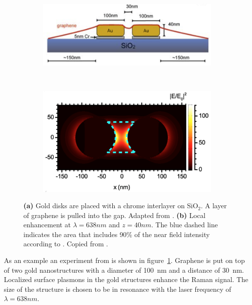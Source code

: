 \begin{figure}[!h]
  \centering
  \begin{subfigure}{0.45\textwidth}
    \includegraphics[width=\textwidth]{./images/sers-schema.png}
  \end{subfigure}
  ~
  \begin{subfigure}{0.45\textwidth}
    \includegraphics[width=\textwidth]{./images/local-enhancement-heeg.png}
  \end{subfigure}
  \caption{\textbf{(a)} Gold disks are placed with a chrome interlayer on SiO$_2$. A layer of graphene is pulled into the gap. Adapted from \cite{heeg}. \textbf{(b)} Local enhancement at $\lambda = 638nm$ and $z=40nm$. The blue dashed line indicates the area that includes 90\% of the near field intensity according to \cite{heeg}. Copied from \cite{heeg}.}
  \label{fig:heeg-experiment}
\end{figure}

As an example an experiment from \cite{heeg} is shown in figure~\ref{fig:heeg-experiment}. Graphene is put on top of two gold nanostructures with a diameter of \SI{100}{nm} and a distance of \SI{30}{nm}. Localized surface plasmons in the gold structures enhance the Raman signal. The size of the structure is chosen to be in resonance with the laser frequency of $\lambda = 638nm$.

